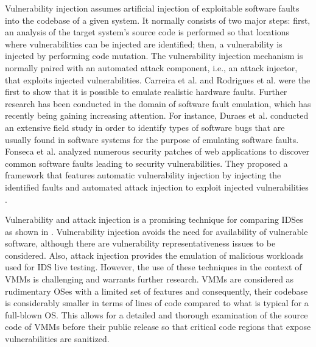 Vulnerability injection assumes artificial injection of exploitable software faults into the codebase of a given system. It normally consists of two major steps: first, an analysis of the target system's source code is performed so that locations where vulnerabilities can be injected are identified; then, a vulnerability is injected by performing code mutation. The vulnerability injection mechanism is normally paired with an automated attack component, i.e., an attack injector, that exploits injected vulnerabilities. Carreira et al. \cite{carreira:xception} and Rodrigues et al. \cite{rodrigues:mafalda} were the first to show that it is possible to emulate realistic hardware faults. Further research has been conducted in the domain of software fault emulation, which has recently being gaining increasing attention. For instance, Duraes et al. \cite{duraes:definition} conducted an extensive field study in order to identify types of software bugs that are usually found in software systems for the purpose of emulating software faults. Fonseca et al. \cite{fonesca:mapping} analyzed numerous security patches of web applications to discover common software faults leading to security vulnerabilities. They proposed a framework that features automatic vulnerability injection by injecting the identified faults and automated attack injection to exploit injected vulnerabilities \cite{fonesca:vulnerability}. 

Vulnerability and attack injection \cite{fonesca:vulnerability} is a promising technique for comparing IDSes as shown in \cite{fonseca:comparingids}. Vulnerability injection avoids the need for availability of vulnerable software, although there are vulnerability representativeness issues to be considered. Also, attack injection provides the emulation of malicious workloads used for IDS live testing. However, the use of these techniques in the context of VMMs is challenging and warrants further research. VMMs are considered as rudimentary OSes with a limited set of features and consequently, their codebase is considerably smaller in terms of lines of code compared to what is typical for a full-blown OS. This allows for a detailed and thorough examination of the source code of VMMs before their public release so that critical code regions that expose vulnerabilities are sanitized. 

